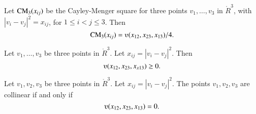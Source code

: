 \begin{tarskidata}
\begin{tarski}
\begin{proved}
\swallowed\end{proved}
\end{tarski}



\begin{tarski}

\begin{lemma}
	Let ${\operatorname{CM}}_3(x_{ij})$ be the Cayley-Menger square for
three points $v_1,\ldots,v_3$ in $\ring{R}^3$, with $|v_i-v_j|^2 = x_{ij}$,
for $1\le i < j \le 3$.  Then
	$$\op{CM}_3(x_{ij}) = \ups(x_{12},x_{23},x_{13})/4.$$
\end{lemma}

\begin{proved}
\swallowed\end{proved}
\end{tarski}



\begin{tarski}

\begin{lemma}
Let $v_1,\ldots,v_3$ be three points
in $\ring{R}^3$.  Let $x_{ij} = |v_i-v_j|^2$.  Then
	$$\ups(x_{12},x_{23},x_{x13})\ge0.$$
\end{lemma}

\begin{proved}
\swallowed\end{proved}
\end{tarski}



\begin{tarski}

\begin{lemma}
Let $v_1,v_2,v_3$ be three points
in $\ring{R}^3$.  Let $x_{ij} = |v_i-v_j|^2$.
The points $v_1,v_2,v_3$ are collinear if and only if
	$$\ups(x_{12},x_{23},x_{13}) = 0.$$
\end{lemma}

\begin{proved}
\swallowed\end{proved}
\end{tarski}




\end{tarskidata}
